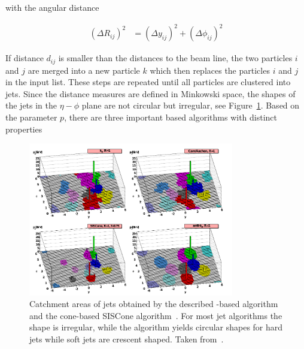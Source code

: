 with the angular distance

\begin{align*}
    \left(\Delta R_{ij}\right)^2 &= (\Delta y_{ij})^2 + (\Delta \phi_{ij})^2
\end{align*} 

If distance $d_{ij}$ is smaller than the distances to the beam line, the two
particles $i$ and $j$ are merged into a new particle $k$ which then replaces the
particles $i$ and $j$ in the input list. These steps are repeated until all
particles are clustered into jets. Since the distance measures are defined in
Minkowski space, the shapes of the jets in the $\eta-\phi$ plane are not circular but
irregular, see Figure~\ref{fig:jet_shapes}. Based on the parameter $p$, there
are three important \kt based algorithms with distinct properties

\begin{figure}[htb]
    \centering
    \includegraphics[width=0.8\textwidth]{figures/jet_reconstruction/jet_shapes.pdf}
    \caption[Jet areas of various jet algorithms]{Catchment areas of jets obtained by the described \kt-based algorithm
        and the cone-based SISCone algorithm~\cite{Salam:2009jx}. For most jet
        algorithms the shape is irregular, while the \antikt algorithm yields
        circular shapes for hard jets while soft jets are crescent shaped. Taken
        from~\cite{Berger:2014aca}.}
    \label{fig:jet_shapes}
\end{figure}


